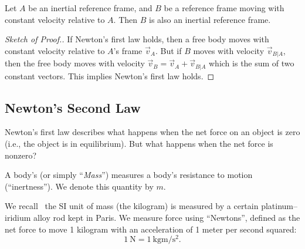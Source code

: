 \begin{theorem}
Let $A$ be an inertial reference frame, and $B$ be a reference frame
moving with constant velocity relative to $A$. Then $B$ is also an
inertial reference frame.
\end{theorem}
\begin{proof}[Sketch of Proof.]
If Newton's first law holds, then a free body moves with constant velocity
relative to $A$'s frame $\vec{v}_{A}$. But if $B$ moves with velocity
$\vec{v}_{B|A}$, then the free body moves with velocity
$\vec{v}_{B}=\vec{v}_{A}+\vec{v}_{B|A}$ which is the sum of two constant
vectors. This implies Newton's first law  holds.
\end{proof}

\subsection{Newton's Second Law}

\M
Newton's first law  describes what happens when
the net force on an object is zero (i.e., the object is in
equilibrium). But what happens when the net force is nonzero?

\begin{definition}
A body's  (or simply ``\emph{Mass\/}'') measures a
body's resistance to motion (``inertness''). We denote this quantity by $m$.
\end{definition}

\begin{remark}
We recall~ the SI unit of mass (the
kilogram) is measured by a certain platinum--iridium alloy rod kept in
Paris. We measure force using ``Newtons'', defined as the net force to
move 1 kilogram with an acceleration of 1 meter per second squared:
\begin{equation}
\SI{1}{\newton}=\SI{1}{\kilo\gram\meter\per\second\squared}.
\end{equation}
\end{remark}

